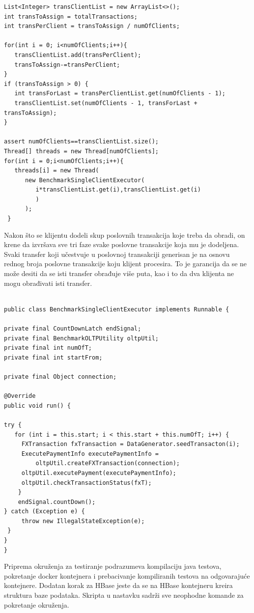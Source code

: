 \documentclass[12pt,oneside]{memoir}
\begin{document}
\begin{lstlisting}[title={Implementacija politike podele posla klijentima},captionpos=t]
List<Integer> transClientList = new ArrayList<>();
int transToAssign = totalTransactions;
int transPerClient = transToAssign / numOfClients;

for(int i = 0; i<numOfClients;i++){	
   transClientList.add(transPerClient);
   transToAssign-=transPerClient;
}
if (transToAssign > 0) {
   int transForLast = transPerClientList.get(numOfClients - 1);
   transClientList.set(numOfClients - 1, transForLast + transToAssign);
}

assert numOfClients==transClientList.size();
Thread[] threads = new Thread[numOfClients];
for(int i = 0;i<numOfClients;i++){
   threads[i] = new Thread(
      new BenchmarkSingleClientExecutor(
         i*transClientList.get(i),transClientList.get(i)
         )
      );
 }
\end{lstlisting}


Nakon što se klijentu dodeli skup poslovnih transakcija koje treba da obradi, on krene da izvršava sve tri faze svake poslovne transakcije koja mu je dodeljena. Svaki transfer koji učestvuje u poslovnoj transakciji generisan je na osnovu rednog broja poslovne transakcije koju klijent procesira. To je garancija da se ne može desiti da se isti transfer obrađuje više puta, kao i to da dva klijenta ne mogu obrađivati isti transfer.

\begin{lstlisting}[title={BenchmarkSingleClientExecutor.java},captionpos=t]

public class BenchmarkSingleClientExecutor implements Runnable {

private final CountDownLatch endSignal;
private final BenchmarkOLTPUtility oltpUtil;
private final int numOfT;
private final int startFrom;

private final Object connection;

@Override
public void run() {

try {
   for (int i = this.start; i < this.start + this.numOfT; i++) {
     FXTransaction fxTransaction = DataGenerator.seedTransacton(i);
     ExecutePaymentInfo executePaymentInfo = 
         oltpUtil.createFXTransaction(connection);
     oltpUtil.executePayment(executePaymentInfo);
     oltpUtil.checkTransactionStatus(fxT);
    }
    endSignal.countDown();
} catch (Exception e) {
     throw new IllegalStateException(e);
 }
}
}
\end{lstlisting}

Priprema okruženja za testiranje podrazumeva kompilaciju java testova, pokretanje docker kontejnera i prebacivanje kompiliranih testova na odgovarajuće kontejnere. Dodatan korak za HBase jeste da se na HBase kontejneru kreira struktura baze podataka. Skripta u nastavku sadrži sve neophodne komande za pokretanje okruženja.
\end{document}
